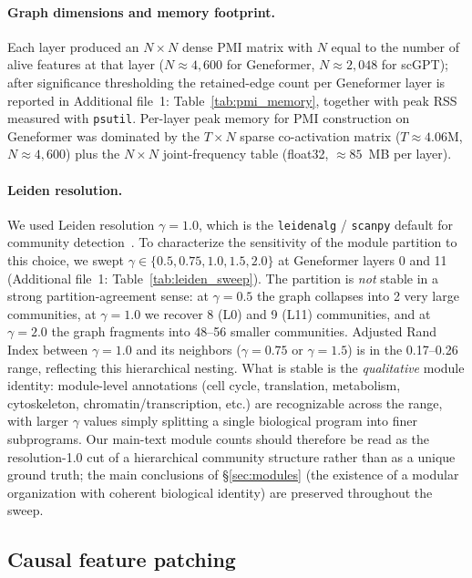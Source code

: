 \documentclass[onecolumn]{article}
\begin{document}
\paragraph{Graph dimensions and memory footprint.} Each layer produced an $N{\times}N$ dense PMI matrix with $N$ equal to the number of alive features at that layer ($N\approx 4{,}600$ for Geneformer, $N\approx 2{,}048$ for scGPT); after significance thresholding the retained-edge count per Geneformer layer is reported in Additional file~1: Table~\ref{tab:pmi_memory}, together with peak RSS measured with \texttt{psutil}. Per-layer peak memory for PMI construction on Geneformer was dominated by the $T{\times}N$ sparse co-activation matrix ($T\approx 4.06\mathrm{M}$, $N\approx 4{,}600$) plus the $N{\times}N$ joint-frequency table (float32, $\approx 85$~MB per layer).

\paragraph{Leiden resolution.} We used Leiden resolution $\gamma = 1.0$, which is the \texttt{leidenalg} / \texttt{scanpy} default for community detection~\cite{traag2019louvain}. To characterize the sensitivity of the module partition to this choice, we swept $\gamma \in \{0.5, 0.75, 1.0, 1.5, 2.0\}$ at Geneformer layers 0 and 11 (Additional file~1: Table~\ref{tab:leiden_sweep}). The partition is \emph{not} stable in a strong partition-agreement sense: at $\gamma{=}0.5$ the graph collapses into 2 very large communities, at $\gamma{=}1.0$ we recover 8 (L0) and 9 (L11) communities, and at $\gamma{=}2.0$ the graph fragments into 48--56 smaller communities. Adjusted Rand Index between $\gamma{=}1.0$ and its neighbors ($\gamma{=}0.75$ or $\gamma{=}1.5$) is in the 0.17--0.26 range, reflecting this hierarchical nesting. What is stable is the \emph{qualitative} module identity: module-level annotations (cell cycle, translation, metabolism, cytoskeleton, chromatin/transcription, etc.) are recognizable across the range, with larger $\gamma$ values simply splitting a single biological program into finer subprograms. Our main-text module counts should therefore be read as the resolution-1.0 cut of a hierarchical community structure rather than as a unique ground truth; the main conclusions of \S\ref{sec:modules} (the existence of a modular organization with coherent biological identity) are preserved throughout the sweep.

\subsection{Causal feature patching}
\end{document}
